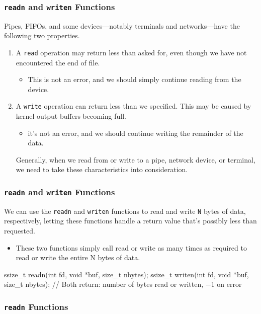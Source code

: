 \documentclass[newPxFont,sthlmFooter,nooffset]{beamer}
\begin{document}
\begin{frame}[t]
  \frametitle{\texttt{readn} and \texttt{writen} Functions}
Pipes, FIFOs, and some devices—notably terminals and networks—have the following
two properties.
\begin{enumerate}
\item A \texttt{read} operation may return less than asked for, even though we have not encountered the end of file.
  \begin{itemize}
  \item This is not an error, and we should simply continue reading from the device.
  \end{itemize}
\item A \texttt{write} operation can return less than we specified. This may be caused by kernel output buffers becoming full.
  \begin{itemize}
  \item it’s not an error, and we should continue writing the
    remainder of the data.
  \end{itemize}
Generally, when we read from or write to a pipe, network device, or terminal, we need to take these characteristics into consideration.
\end{enumerate}
\end{frame}

\begin{frame}[t, fragile]
  \frametitle{\texttt{readn} and \texttt{writen} Functions}
We can use the \texttt{readn} and \texttt{writen} functions to read and write \texttt{N} bytes of data, respectively, letting these functions handle a return value that’s possibly less than requested.
\begin{itemize}
\item These two functions simply call read or write as many times as required to read or write the entire N bytes of data.
\end{itemize}
\begin{codedef}
ssize_t readn(int fd, void *buf, size_t nbytes);
ssize_t writen(int fd, void *buf, size_t nbytes);
// Both return: number of bytes read or written, −1 on error
\end{codedef}
\end{frame}

\begin{frame}[t]
  \frametitle{\texttt{readn} Functions}
  

\end{frame}
\end{document}
